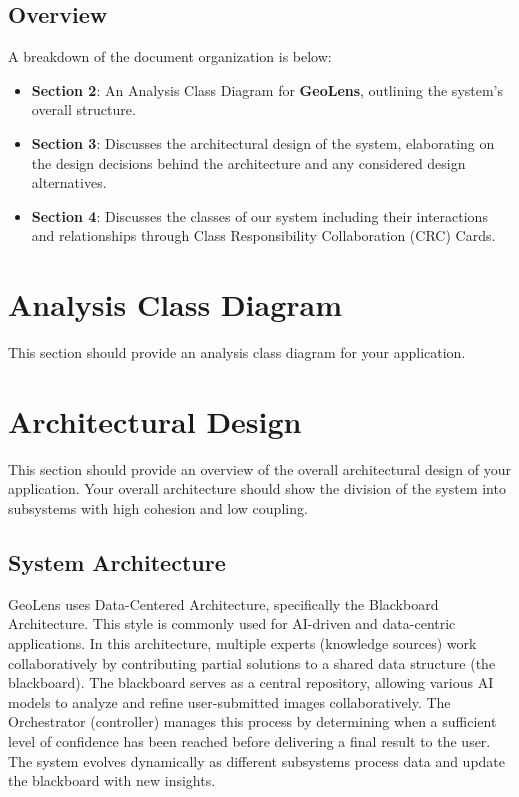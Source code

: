 \documentclass[]{article}
\begin{document}
\subsection{Overview}
\label{sub:overview}
A breakdown of the document organization is below:
\begin{itemize}
  \item \textbf{Section 2}: An Analysis Class Diagram for \textbf{GeoLens}, outlining the system’s overall structure.
  \item \textbf{Section 3}: Discusses the architectural design of the system, elaborating on the design decisions behind the architecture and any considered design alternatives.
  \item \textbf{Section 4}: Discusses the classes of our system including their interactions and relationships through Class Responsibility Collaboration (CRC) Cards.
\end{itemize}



\section{Analysis Class Diagram}
\label{sec:analysis_class_diagram}
This section should provide an analysis class diagram for your application.


\section{Architectural Design}
\label{sec:architectural_design}
This section should provide an overview of the overall architectural design of your application. Your overall architecture should show the division of the system into subsystems with high cohesion and low coupling.

\subsection{System Architecture}
\label{sub:system_architecture}


GeoLens uses Data-Centered Architecture, specifically the Blackboard Architecture. This style is commonly used for AI-driven and data-centric applications. In this architecture, multiple experts (knowledge sources) work collaboratively by contributing partial solutions to a shared data structure (the blackboard). The blackboard serves as a central repository, allowing various AI models to analyze and refine user-submitted images collaboratively. The Orchestrator (controller) manages this process by determining when a sufficient level of confidence has been reached before delivering a final result to the user. The system evolves dynamically as different subsystems process data and update the blackboard with new insights.\\
\end{document}
